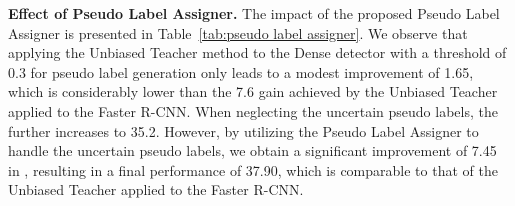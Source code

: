 \documentclass[10pt,twocolumn,letterpaper]{article}
\begin{document}
\textbf{Effect of Pseudo Label Assigner.} The impact of the proposed Pseudo Label Assigner is presented in Table~\ref{tab:pseudo label assigner}. We observe that applying the Unbiased Teacher method to the Dense detector with a threshold of 0.3 for pseudo label generation only leads to a modest  improvement of 1.65, which is considerably lower than the 7.6  gain achieved by the Unbiased Teacher\cite{liu2021unbiased} applied to the Faster R-CNN. When neglecting the uncertain pseudo labels, the  further increases to 35.2. However, by utilizing the Pseudo Label Assigner to handle the uncertain pseudo labels, we obtain a significant improvement of 7.45 in , resulting in a final performance of 37.90, which is comparable to that of the Unbiased Teacher applied to the Faster R-CNN.
\begin{table}[h]
  \caption{Ablation study about different pseudo label assignment methods.}
  \label{tab:pseudo label assigner}
\end{table}
\end{document}
